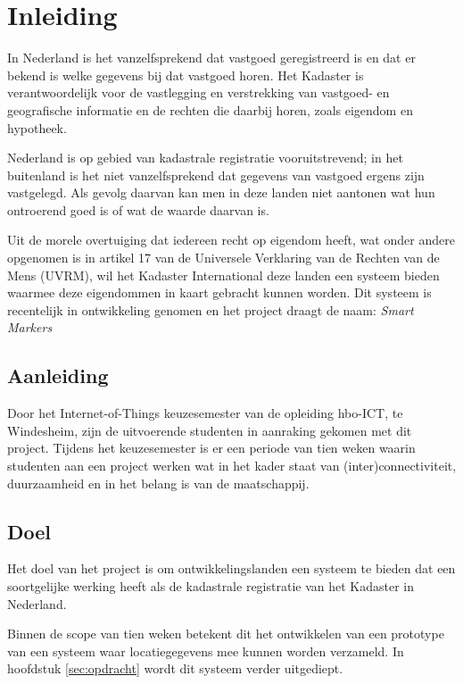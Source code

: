 \section{Inleiding}
\label{sec:inleiding}
In Nederland is het vanzelfsprekend dat vastgoed geregistreerd is en dat er bekend
is welke gegevens bij dat vastgoed horen. Het Kadaster is verantwoordelijk voor de
vastlegging en verstrekking van vastgoed- en geografische informatie en de rechten
die daarbij horen, zoals eigendom en hypotheek.

Nederland is op gebied van kadastrale registratie vooruitstrevend; in het buitenland
is het niet vanzelfsprekend dat gegevens van vastgoed ergens zijn vastgelegd.
Als gevolg daarvan kan men in deze landen niet aantonen wat hun ontroerend goed is 
of wat de waarde daarvan is.

Uit de morele overtuiging dat iedereen recht op eigendom heeft, wat onder andere
opgenomen is in artikel 17 van de Universele Verklaring van de Rechten van
de Mens (UVRM), wil het Kadaster International deze landen een systeem bieden waarmee
deze eigendommen in kaart gebracht kunnen worden. Dit systeem is recentelijk in
ontwikkeling genomen en het project draagt de naam: \textit{Smart Markers}

\subsection{Aanleiding}
Door het Internet-of-Things keuzesemester van de opleiding hbo-ICT, te Windesheim,
zijn de uitvoerende studenten in aanraking gekomen met dit project. Tijdens het
keuzesemester is er een periode van tien weken waarin studenten aan een project
werken wat in het kader staat van (inter)connectiviteit, duurzaamheid en in het
belang is van de maatschappij.

\subsection{Doel}
Het doel van het project is om ontwikkelingslanden een systeem te bieden dat
een soortgelijke werking heeft als de kadastrale registratie van het Kadaster
in Nederland.

Binnen de scope van tien weken betekent dit het ontwikkelen van een prototype
van een systeem waar locatiegegevens mee kunnen worden verzameld. In hoofdstuk 
\ref{sec:opdracht} wordt dit systeem verder uitgediept.
